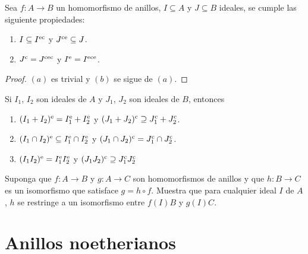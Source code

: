 \begin{proposition}
  Sea $f\colon A \to B$ un homomorfismo de anillos, $I\subseteq A$ y $J\subseteq B$ ideales, se cumple las siguiente propiedades:
  \begin{enumerate}
    \item $I \subseteq I^{\mathrm{e}\mathrm{c}}$ y $J^{\mathrm{c}\mathrm{e}} \subseteq J$.
    \item $J^{\mathrm{c}} = J^{\mathrm{c}\mathrm{e}\mathrm{c}}$ y $I^{\mathrm{e}} = I^{\mathrm{e}\mathrm{c}\mathrm{e}}$.
  \end{enumerate}
\end{proposition}
\begin{proof}
  $(a)$ es trivial y $(b)$ se sigue de $(a)$.
\end{proof}




\ExerciseSection

\begin{exerciseList}
  \item Si $I_1$, $I_2$ son ideales de $A$ y $J_1$, $J_2$ son ideales de $B$, entonces
    \begin{enumerate}
      \item $(I_1+I_2)^{\mathrm{e}} = I_1^{\mathrm{e}} + I_2^{\mathrm{e}}$ y $(J_1+J_2)^{\mathrm{c}} \supseteq J_1^{\mathrm{c}} + J_2^{\mathrm{c}}$.
      \item $(I_1 \cap I_2)^{\mathrm{e}} \subseteq I_1^{\mathrm{e}} \cap I_2^{\mathrm{e}}$ y $(J_1 \cap J_2)^{\mathrm{c}} = J_1^{\mathrm{c}} \cap J_2^{\mathrm{c}}$.
      \item $(I_1 I_2)^{\mathrm{e}} = I_1^{\mathrm{e}} I_2^{\mathrm{e}}$ y $(J_1 J_2)^{\mathrm{c}} \supseteq J_1^{\mathrm{c}} J_2^{\mathrm{c}}$
    \end{enumerate}

  \item Suponga que $f\colon A \to B $ y $g\colon A \to C$ son homomorfismos de anillos y que $h\colon B \to C$ es un isomorfismo que satisface $g = h \circ f$. Muestra que para cualquier ideal $I$ de $A$, $h$ se restringe a un isomorfismo entre $f(I)B$ y $g(I)C$.
\end{exerciseList}




\section{Anillos noetherianos}

